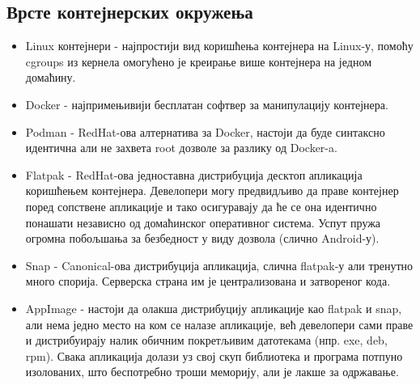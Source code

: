 \documentclass[a4paper,14pt]{article}
\begin{document}
\subsection{Врсте контејнерских окружења}
\begin{itemize}
\item Linux контејнери\cite{lxc} - најпростији вид коришћења контејнера на Linux-у, помоћу cgroups из кернела омогућено је креирање више контејнера на једном домаћину.
\item Docker\cite{docker} - најпримењивији бесплатан софтвер за манипулацију контејнера.
\item Podman\cite{podman} - RedHat-ова алтернатива за Docker, настоји да буде синтаксно идентична али не захвета root дозволе за разлику од Docker-a.
\item Flatpak\cite{flatpak} - RedHat-ова једноставна дистрибуција десктоп апликација коришћењем контејнера. Девелопери могу предвидљиво да праве контејнер поред сопствене апликације и тако осигуравају да ће се она идентично понашати независно од домаћинског оперативног система. Успут пружа огромна побољшања за безбедност у виду дозвола (слично Android-у).
\item Snap\cite{snap} - Canonical-ова дистрибуција апликација, слична flatpak-у али тренутно много спорија. Серверска страна им је централизована и затвореног кода.
\item AppImage\cite{appimage} - настоји да олакша дистрибуцију апликације као flatpak и snap, али нема једно место на ком се налазе апликације, већ девелопери сами праве и дистрибуирају налик обичним покретљивим датотекама (нпр. exe, deb, rpm). Свака апликација долази уз свој скуп библиотека и програма потпуно изолованих, што беспотребно троши меморију, али је лакше за одржавање.
\end{itemize}
\newpage
\end{document}
